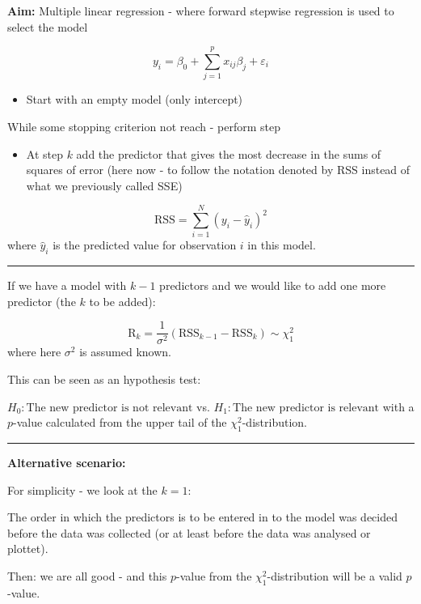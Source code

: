 \documentclass[
  letterpaper,
  DIV=11,
  numbers=noendperiod]{scrartcl}
\providecommand{\tightlist}{%
  \setlength{\itemsep}{0pt}\setlength{\parskip}{0pt}}\usepackage{longtable,booktabs,array}
\begin{document}
\textbf{Aim:} Multiple linear regression - where forward stepwise
regression is used to select the model

\[y_i=\beta_0+\sum_{j=1}^p x_{ij}\beta_j + \varepsilon_i\]

\begin{itemize}
\tightlist
\item
  Start with an empty model (only intercept)
\end{itemize}

While some stopping criterion not reach - perform step

\begin{itemize}
\tightlist
\item
  At step \(k\) add the predictor that gives the most decrease in the
  sums of squares of error (here now - to follow the notation denoted by
  RSS instead of what we previously called SSE)
\end{itemize}

\[ \text{RSS}=\sum_{i=1}^N (y_i -\hat{y}_i)^2\] where \(\hat{y}_i\) is
the predicted value for observation \(i\) in this model.

\begin{center}\rule{0.5\linewidth}{0.5pt}\end{center}

If we have a model with \(k-1\) predictors and we would like to add one
more predictor (the \(k\) to be added):

\[ \text{R}_k=\frac{1}{\sigma^2}(\text{RSS}_{k-1}-\text{RSS}_{k})\sim \chi^2_1\]
where here \(\sigma^2\) is assumed known.

This can be seen as an hypothesis test:

\(H_0: \text{The new predictor is not relevant}\) vs.
\(H_1: \text{The new predictor is relevant}\) with a \(p\)-value
calculated from the upper tail of the \(\chi^2_1\)-distribution.

\begin{center}\rule{0.5\linewidth}{0.5pt}\end{center}

\textbf{Alternative scenario:}

For simplicity - we look at the \(k=1\):

The order in which the predictors is to be entered in to the model was
decided before the data was collected (or at least before the data was
analysed or plottet).

Then: we are all good - and this \(p\)-value from the
\(\chi^2_1\)-distribution will be a valid \(p\)-value.
\end{document}
